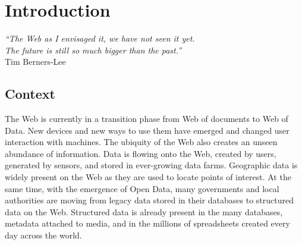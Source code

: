 \chapter{Introduction}
\label{intro}

\begin{flushright}
\textit{``The Web as I envisaged it, we have not seen it yet.\\ 
The future is still so much bigger than the past.''\\}
Tim Berners-Lee
\end{flushright}


\section{Context}
\label{sec:context}
The Web is currently in a transition phase from Web of documents to Web of Data. New devices and new ways to use them have emerged and changed user interaction with machines. The ubiquity of the Web also creates an unseen 
abundance of information. Data is flowing onto the Web, created by users, generated by sensors, and stored in ever-growing data farms. Geographic data is widely present on the Web as they are used to locate points of interest. At the same time, with the emergence of Open Data, many governments and local authorities are moving from legacy data stored in their databases
to structured data on the Web. Structured data is already present in the many databases, metadata attached to media, and in the millions of spreadsheets created every day across the world. 

